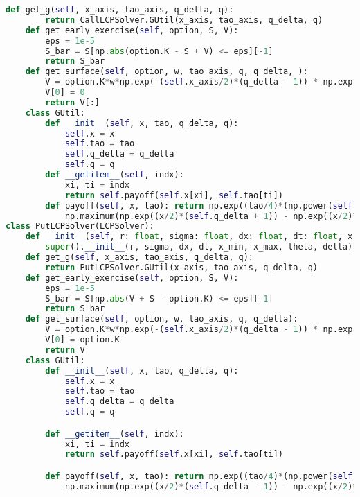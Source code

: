 \begin{lstlisting}[language=Python, caption=PSOR-LCP solver for Company transformation.]
    def get_g(self, x_axis, tao_axis, q_delta, q):
        return CallLCPSolver.GUtil(x_axis, tao_axis, q_delta, q)
    def get_early_exercise(self, option, S, V):
        eps = 1e-5
        S_bar = S[np.abs(option.K - S + V) <= eps][-1]
        return S_bar
    def get_surface(self, option, w, tao_axis, q, q_delta, ):
        V = option.K*w*np.exp(-(self.x_axis/2)*(q_delta - 1)) * np.exp(-tao_axis[-1]*((1/4)*np.power(q_delta - 1, 2) + q))
        V[0] = 0
        return V[:]      
    class GUtil: 
        def __init__(self, x, tao, q_delta, q):
            self.x = x
            self.tao = tao
            self.q_delta = q_delta
            self.q = q  
        def __getitem__(self, indx):
            xi, ti = indx
            return self.payoff(self.x[xi], self.tao[ti])
        def payoff(self, x, tao): return np.exp((tao/4)*(np.power(self.q_delta-1, 2) + 4*self.q)) * \
            np.maximum(np.exp((x/2)*(self.q_delta + 1)) - np.exp((x/2)*(self.q_delta - 1)), 0)
class PutLCPSolver(LCPSolver):
    def __init__(self, r: float, sigma: float, dx: float, dt: float, x_min=-3, x_max=3, theta=0, delta=0):
        super().__init__(r, sigma, dx, dt, x_min, x_max, theta, delta)
    def get_g(self, x_axis, tao_axis, q_delta, q):
        return PutLCPSolver.GUtil(x_axis, tao_axis, q_delta, q)
    def get_early_exercise(self, option, S, V):
        eps = 1e-5
        S_bar = S[np.abs(V + S - option.K) <= eps][-1]
        return S_bar
    def get_surface(self, option, w, tao_axis, q, q_delta):
        V = option.K*w*np.exp(-(self.x_axis/2)*(q_delta - 1)) * np.exp(-tao_axis[-1]*((1/4)*np.power(q_delta - 1, 2) + q))
        V[0] = option.K
        return V
    class GUtil: 
        def __init__(self, x, tao, q_delta, q):
            self.x = x
            self.tao = tao
            self.q_delta = q_delta
            self.q = q

        def __getitem__(self, indx):
            xi, ti = indx
            return self.payoff(self.x[xi], self.tao[ti])

        def payoff(self, x, tao): return np.exp((tao/4)*(np.power(self.q_delta-1, 2) + 4*self.q)) * \
            np.maximum(np.exp((x/2)*(self.q_delta - 1)) - np.exp((x/2)*(self.q_delta + 1)), 0)
\end{lstlisting}